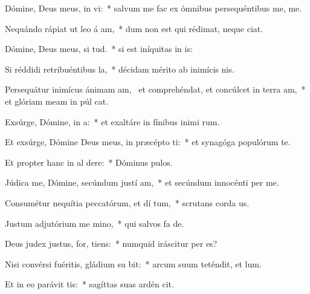 \item Dómine, Deus meus, in  vi:~* salvum me fac ex ómnibus persequéntibus me,   me.
\item Nequándo rápiat ut leo á am,~* dum non est qui rédimat, neque   ciat.
\item Dómine, Deus meus, si  tud.~* si est iníquitas in  is:
\item Si réddidi retribuéntibus  la,~* décidam mérito ab inimícis  nis.
\item Persequátur inimícus ánimam am,~\pscross{} et comprehéndat, et concúlcet in terra  am,~* et glóriam meam in púl cat.
\item Exsúrge, Dómine, in  a:~* et exaltáre in fínibus inimi rum.
\item Et exsúrge, Dómine Deus meus, in præcépto  ti:~* et synagóga populórum  te.
\item Et propter hanc in al dere:~* Dóminus  pulos.
\item Júdica me, Dómine, secúndum justí am,~* et secúndum innocénti  per me.
\item Consumétur nequítia peccatórum, et dí tum,~* scrutans corda   us.
\item Justum adjutórium me  mino,~* qui salvos fa  de.
\item Deus judex justus, for,  tiens:~* numquid iráscitur per  es?
\item Nisi convérsi fuéritis, gládium su bit:~* arcum suum teténdit, et  lum.
\item Et in eo parávit  tis:~* sagíttas suas ardén cit.
